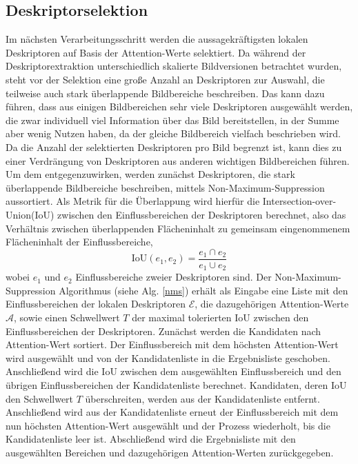 \subsection{Deskriptorselektion}\label{selection_chapter}
Im nächsten Verarbeitungsschritt werden die aussagekräftigsten lokalen Deskriptoren auf Basis der Attention-Werte selektiert. Da während der Deskriptorextraktion unterschiedlich skalierte Bildversionen betrachtet wurden, steht vor der Selektion eine große Anzahl an Deskriptoren zur Auswahl, die teilweise auch stark überlappende Bildbereiche beschreiben. Das kann dazu führen, dass aus einigen Bildbereichen sehr viele Deskriptoren ausgewählt werden, die zwar individuell viel Information über das Bild bereitstellen, in der Summe aber wenig Nutzen haben, da der gleiche Bildbereich vielfach beschrieben wird. Da die Anzahl der selektierten Deskriptoren pro Bild begrenzt ist, kann dies zu einer Verdrängung von Deskriptoren aus anderen wichtigen Bildbereichen führen. Um dem entgegenzuwirken, werden zunächst Deskriptoren, die stark überlappende Bildbereiche beschreiben, mittels Non-Maximum-Suppression aussortiert. Als Metrik für die Überlappung wird hierfür die Intersection-over-Union(IoU) zwischen den Einflussbereichen der Deskriptoren berechnet, also das Verhältnis zwischen überlappenden Flächeninhalt zu gemeinsam eingenommenem Flächeninhalt der Einflussbereiche,
\begin{equation}
\text{IoU}(e_1,e_2) = \frac{e_1 \cap e_2}{e_1 \cup e_2}
\end{equation}
wobei $e_1$ und $e_2$ Einflussbereiche zweier Deskriptoren sind. Der Non-Maximum-Suppression Algorithmus (siehe Alg. \ref{nms}) erhält als Eingabe eine Liste mit den Einflussbereichen der lokalen Deskriptoren $\mathcal{E}$, die dazugehörigen Attention-Werte $\mathcal{A}$, sowie einen Schwellwert $T$ der maximal tolerierten IoU zwischen den Einflussbereichen der Deskriptoren. Zunächst werden die Kandidaten nach Attention-Wert sortiert. Der Einflussbereich mit dem höchsten Attention-Wert wird ausgewählt und von der Kandidatenliste in die Ergebnisliste geschoben. Anschließend wird die IoU zwischen dem ausgewählten Einflussbereich und den übrigen Einflussbereichen der Kandidatenliste berechnet. Kandidaten, deren IoU den Schwellwert $T$ überschreiten, werden aus der Kandidatenliste entfernt. Anschließend wird aus der Kandidatenliste erneut der Einflussbereich mit dem nun höchsten Attention-Wert ausgewählt und der Prozess wiederholt, bis die Kandidatenliste leer ist. Abschließend wird die Ergebnisliste mit den ausgewählten Bereichen und dazugehörigen Attention-Werten zurückgegeben.

